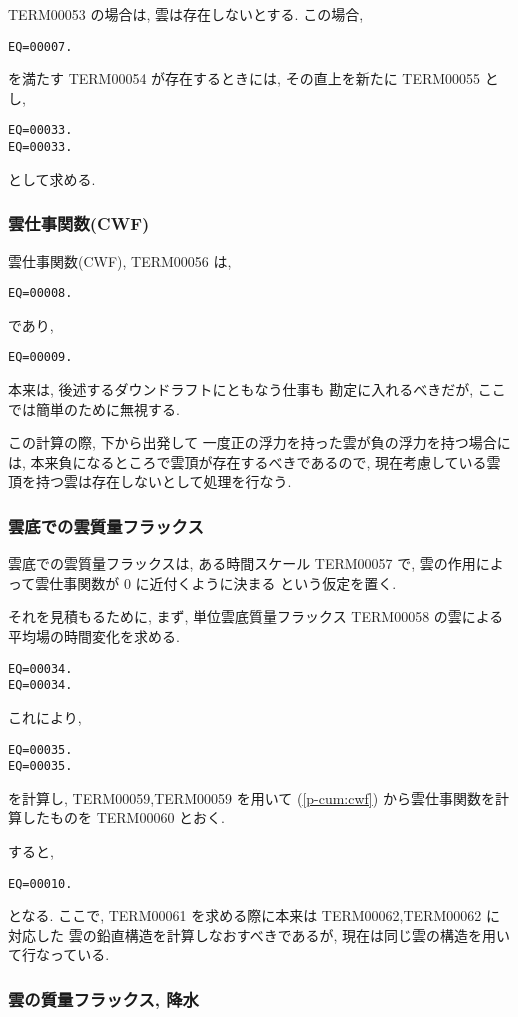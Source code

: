 TERM00053 の場合は,
雲は存在しないとする. この場合,
\begin{verbatim}
EQ=00007.
\end{verbatim}
を満たす TERM00054 が存在するときには,
その直上を新たに TERM00055 とし,
\begin{verbatim}
EQ=00033.
EQ=00033.
\end{verbatim}
として求める.

\subsubsection{雲仕事関数(CWF)}

雲仕事関数(CWF), TERM00056 は,
\begin{verbatim}
EQ=00008.
\end{verbatim}
であり,
\begin{verbatim}
EQ=00009.
\end{verbatim}
本来は, 後述するダウンドラフトにともなう仕事も
勘定に入れるべきだが, ここでは簡単のために無視する.

この計算の際, 下から出発して
一度正の浮力を持った雲が負の浮力を持つ場合には,
本来負になるところで雲頂が存在するべきであるので,
現在考慮している雲頂を持つ雲は存在しないとして処理を行なう.

\subsubsection{雲底での雲質量フラックス}

雲底での雲質量フラックスは,
ある時間スケール TERM00057 で,
雲の作用によって雲仕事関数が 0 に近付くように決まる
という仮定を置く.

それを見積もるために, まず, 単位雲底質量フラックス TERM00058 の雲による
平均場の時間変化を求める.
\begin{verbatim}
EQ=00034.
EQ=00034.
\end{verbatim}
これにより,
\begin{verbatim}
EQ=00035.
EQ=00035.
\end{verbatim}
を計算し, TERM00059,TERM00059 を用いて
(\ref{p-cum:cwf}) から雲仕事関数を計算したものを TERM00060 とおく.

すると,
\begin{verbatim}
EQ=00010.
\end{verbatim}
となる.
ここで, TERM00061 を求める際に本来は TERM00062,TERM00062 に対応した
雲の鉛直構造を計算しなおすべきであるが, 
現在は同じ雲の構造を用いて行なっている.

\subsubsection{雲の質量フラックス, 降水}

